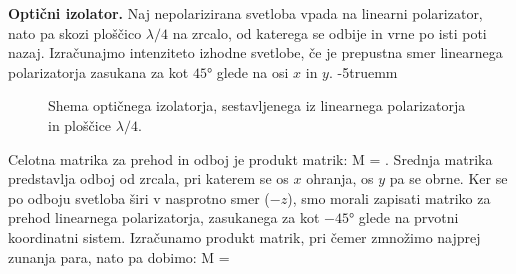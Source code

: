 \begin{example}{\bf Optični izolator.} 
\label{ex_izolator}
Naj nepolarizirana svetloba vpada na linearni polarizator, 
nato pa skozi ploščico $\lambda/4$ na zrcalo, od katerega
se odbije in vrne po isti poti nazaj. Izračunajmo intenziteto
izhodne svetlobe, če je prepustna smer linearnega polarizatorja
zasukana za kot $45\si{\degree}$ glede na osi $x$ in $y$. 
\vglue-5truemm
\begin{figure}[h!]
\centering
\def\svgwidth{100truemm} 

\caption{Shema optičnega izolatorja, sestavljenega iz 
linearnega polarizatorja in ploščice $\lambda/4$.}
\label{fig:03_CirkularniOdboj}
\end{figure}

Celotna matrika za prehod in odboj je produkt matrik:
\beq
 M = \left[\begin{array}{cc}
1 & -1 \\
-1 & 1\\
\end{array}\right]\cdot 
\left[\begin{array}{cc}
1 & 0 \\
0 & i\\
\end{array}\right]\cdot 
\left[\begin{array}{cc}
1 & 0 \\
0 & -1\\
\end{array}\right]\cdot
\left[\begin{array}{cc}
1 & 0 \\
0 & i\\
\end{array}\right]
\left[\begin{array}{cc}
1 &  1 \\
1 & 1\\
\end{array}\right]\!\!.
\label{eq:03_61}
\eeq
Srednja matrika predstavlja odboj od zrcala, pri katerem se os $x$ ohranja, 
os $y$ pa se obrne. Ker se po odboju svetloba širi v nasprotno
smer ($-z$), smo morali zapisati matriko za prehod linearnega polarizatorja,
zasukanega za kot $-45\si{\degree}$ glede na prvotni koordinatni sistem. 
Izračunamo produkt matrik, pri čemer zmnožimo najprej zunanja para, nato pa dobimo:
\beq
 M = \left[\begin{array}{cc}
1 & -i \\
-1 & i\\
\end{array}\right]\cdot 

\end{example}
